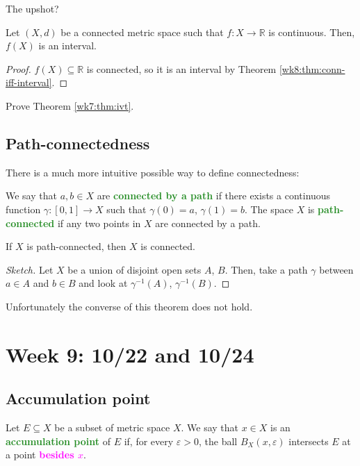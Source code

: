 \documentclass[10pt]{scrartcl}
\providecommand{\eps}{\varepsilon}
\providecommand{\RR}{\mathbb R}
\providecommand{\alert}[1]{{\sffamily\textbf{\textcolor{magenta}{#1}}}}
\providecommand{\inv}{^{-1}}
\providecommand{\vocab}[1]{{\textbf{\textcolor{ForestGreen}{#1}}}}
\begin{document}
The upshot?
\begin{theorem}
	Let $(X, d)$ be a connected metric space
	such that $f\colon X\to\RR$ is continuous.
	Then, $f(X)$ is an interval.
\end{theorem}
\begin{proof}
	$f(X)\subseteq\RR$ is connected, so it is an interval
	by Theorem \ref{wk8:thm:conn-iff-interval}.
\end{proof}

\begin{exercise}
	Prove Theorem \ref{wk7:thm:ivt}.
\end{exercise}

\subsection{Path-connectedness}
There is a much more intuitive possible way to define connectedness:

\begin{definition}
	\label{wk8:def:pathconn}
	We say that $a,b\in X$ are \vocab{connected by a path}
	if there exists a continuous function $\gamma\colon[0, 1]\to X$
	such that $\gamma(0) = a$, $\gamma(1) = b$.
	The space $X$ is \vocab{path-connected} if
	any two points in $X$ are connected by a path.
\end{definition}

\begin{theorem}
	\label{wk8:thm:pathconn-implies-conn}
	If $X$ is path-connected, then $X$ is connected.
\end{theorem}
\begin{proof}[Sketch]
	Let $X$ be a union of disjoint open sets $A$, $B$.
	Then, take a path $\gamma$ between $a\in A$ and $b\in B$
	and look at $\gamma\inv(A)$, $\gamma\inv(B)$.	
\end{proof}

Unfortunately the converse of this theorem does not hold.

\pagebreak
\section{Week 9: 10/22 and 10/24}
\subsection{Accumulation point}
\begin{definition}\label{wk9:def:accumulationpt}
	Let $E\subseteq X$ be a subset of metric space $X$.
	We say that $x\in X$ is an \vocab{accumulation point} of $E$
	if, for every $\eps > 0$, the ball $B_X(x, \eps)$
	intersects $E$ at a point \alert{besides $x$}.
\end{definition}
\end{document}
